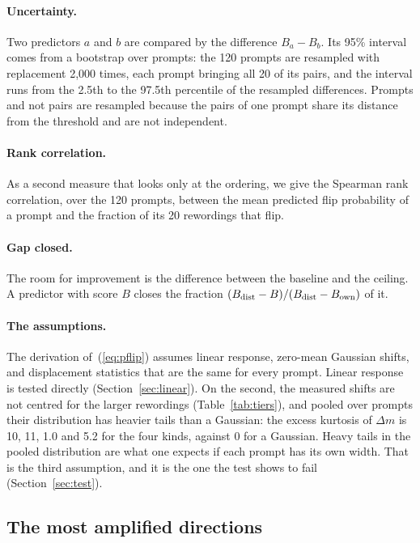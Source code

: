 \documentclass[11pt]{article}
\newcommand{\Dm}{\Delta m}
\begin{document}
\paragraph{Uncertainty.} Two predictors $a$ and $b$ are compared by the difference $B_a-B_b$. Its 95\% interval comes from a bootstrap over prompts: the 120 prompts are resampled with replacement 2{,}000 times, each prompt bringing all 20 of its pairs, and the interval runs from the 2.5th to the 97.5th percentile of the resampled differences. Prompts and not pairs are resampled because the pairs of one prompt share its distance from the threshold and are not independent.

\paragraph{Rank correlation.} As a second measure that looks only at the ordering, we give the Spearman rank correlation, over the 120 prompts, between the mean predicted flip probability of a prompt and the fraction of its 20 rewordings that flip.

\paragraph{Gap closed.} The room for improvement is the difference between the baseline and the ceiling. A predictor with score $B$ closes the fraction $(B_{\rm dist}-B)/(B_{\rm dist}-B_{\rm own})$ of it.

\paragraph{The assumptions.} The derivation of~(\ref{eq:pflip}) assumes linear response, zero-mean Gaussian shifts, and displacement statistics that are the same for every prompt. Linear response is tested directly (Section~\ref{sec:linear}). On the second, the measured shifts are not centred for the larger rewordings (Table~\ref{tab:tiers}), and pooled over prompts their distribution has heavier tails than a Gaussian: the excess kurtosis of $\Dm$ is 10, 11, 1.0 and 5.2 for the four kinds, against 0 for a Gaussian. Heavy tails in the pooled distribution are what one expects if each prompt has its own width. That is the third assumption, and it is the one the test shows to fail (Section~\ref{sec:test}).

\subsection{The most amplified directions}
\label{sec:svd}
\end{document}
